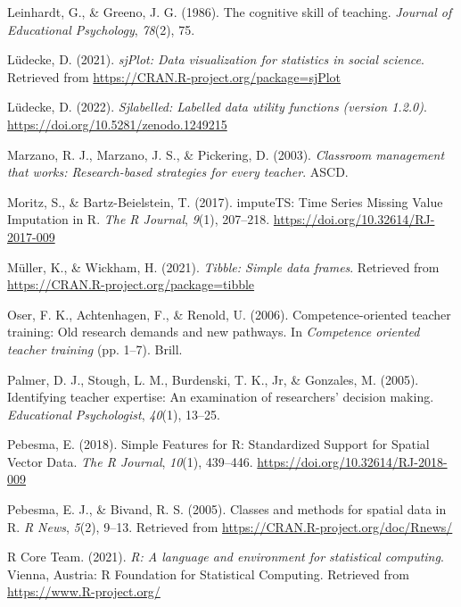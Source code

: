 \documentclass[
  man]{apa6}
\newlength{\cslhangindent}
\newenvironment{CSLReferences}[2] %
 {\begin{list}{}{%
  \setlength{\itemindent}{0pt}
  \setlength{\leftmargin}{0pt}
  \setlength{\parsep}{0pt}
  \ifodd #1
   \setlength{\leftmargin}{\cslhangindent}
   \setlength{\itemindent}{-1\cslhangindent}
  \fi
  \setlength{\itemsep}{#2\baselineskip}}}
 {\end{list}}
\begin{document}
\begin{CSLReferences}{1}{0}
Leinhardt, G., \& Greeno, J. G. (1986). The cognitive skill of teaching. \emph{Journal of Educational Psychology}, \emph{78}(2), 75.

Lüdecke, D. (2021). \emph{sjPlot: Data visualization for statistics in social science}. Retrieved from \url{https://CRAN.R-project.org/package=sjPlot}

Lüdecke, D. (2022). \emph{Sjlabelled: Labelled data utility functions (version 1.2.0)}. \url{https://doi.org/10.5281/zenodo.1249215}

Marzano, R. J., Marzano, J. S., \& Pickering, D. (2003). \emph{Classroom management that works: Research-based strategies for every teacher}. ASCD.

Moritz, S., \& Bartz-Beielstein, T. (2017). {imputeTS: Time Series Missing Value Imputation in R}. \emph{{The R Journal}}, \emph{9}(1), 207--218. \url{https://doi.org/10.32614/RJ-2017-009}

Müller, K., \& Wickham, H. (2021). \emph{Tibble: Simple data frames}. Retrieved from \url{https://CRAN.R-project.org/package=tibble}

Oser, F. K., Achtenhagen, F., \& Renold, U. (2006). Competence-oriented teacher training: Old research demands and new pathways. In \emph{Competence oriented teacher training} (pp. 1--7). Brill.

Palmer, D. J., Stough, L. M., Burdenski, T. K., Jr, \& Gonzales, M. (2005). Identifying teacher expertise: An examination of researchers' decision making. \emph{Educational Psychologist}, \emph{40}(1), 13--25.

Pebesma, E. (2018). {Simple Features for R: Standardized Support for Spatial Vector Data}. \emph{{The R Journal}}, \emph{10}(1), 439--446. \url{https://doi.org/10.32614/RJ-2018-009}

Pebesma, E. J., \& Bivand, R. S. (2005). Classes and methods for spatial data in {R}. \emph{R News}, \emph{5}(2), 9--13. Retrieved from \url{https://CRAN.R-project.org/doc/Rnews/}

R Core Team. (2021). \emph{R: A language and environment for statistical computing}. Vienna, Austria: R Foundation for Statistical Computing. Retrieved from \url{https://www.R-project.org/}


\end{CSLReferences}
\end{document}
